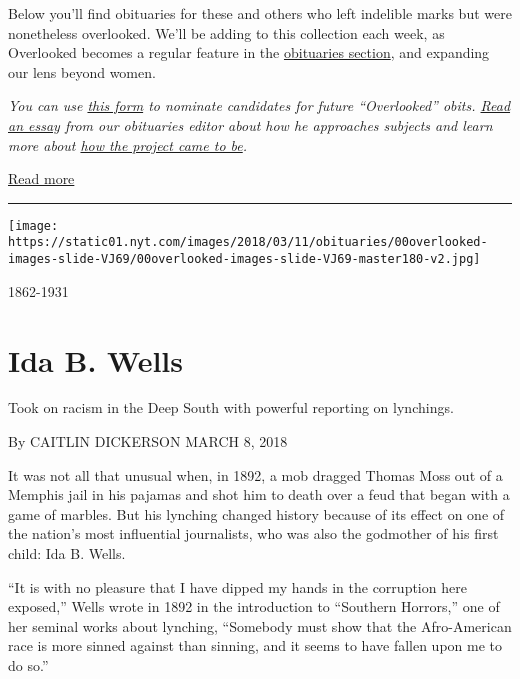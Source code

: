 Below you'll find obituaries for these and others who left indelible
marks but were nonetheless overlooked. We'll be adding to this
collection each week, as Overlooked becomes a regular feature in the
\href{https://www.nytimes.com/section/obituaries}{obituaries section},
and expanding our lens beyond women.

\emph{You can use
\href{https://www.nytimes.com/interactive/2018/obituaries/formacist-overlooked.html}{this
form} to nominate candidates for future ``Overlooked'' obits.
\href{https://www.nytimes.com/2018/03/08/obituaries/overlooked-from-the-death-desk-why-most-obits-are-still-of-white-men.html}{Read
an essay} from our obituaries editor about how he approaches subjects
and learn more about
\href{https://www.nytimes.com/2018/03/08/insider/overlooked-obituary.html}{how
the project came to be}.}

\href{https://www.nytimes.com/interactive/2018/obituaries/overlooked.html}{Read
more}

\begin{center}\rule{0.5\linewidth}{\linethickness}\end{center}

\texttt{[image: https://static01.nyt.com/images/2018/03/11/obituaries/00overlooked-images-slide-VJ69/00overlooked-images-slide-VJ69-master180-v2.jpg]}

1862-1931

\hypertarget{ida-b-wells}{%
\section{Ida B. Wells}\label{ida-b-wells}}

Took on racism in the Deep South with powerful reporting on lynchings.

By CAITLIN DICKERSON MARCH 8, 2018

It was not all that unusual when, in 1892, a mob dragged Thomas Moss out
of a Memphis jail in his pajamas and shot him to death over a feud that
began with a game of marbles. But his lynching changed history because
of its effect on one of the nation's most influential journalists, who
was also the godmother of his first child: Ida B. Wells.

``It is with no pleasure that I have dipped my hands in the corruption
here exposed,'' Wells wrote in 1892 in the introduction to ``Southern
Horrors,'' one of her seminal works about lynching, ``Somebody must show
that the Afro-American race is more sinned against than sinning, and it
seems to have fallen upon me to do so.''

